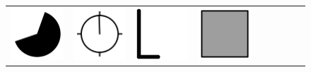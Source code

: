 \documentclass[doc]{apa6}
\newcommand{\stimulusscale}{.1}
\begin{document}
\begin{figure}[p]
\begin{center}
\begin{tabular}{c|cccccccc}
\includegraphics[scale=\stimulusscale]{./set1stim75.png} &
\includegraphics[scale=\stimulusscale]{./set2stim75.png} &
\includegraphics[scale=\stimulusscale]{./set3stim75.png} &
\includegraphics[scale=\stimulusscale]{./set4stim75.png} &

\end{tabular}
\end{center}
\end{figure}
\end{document}
